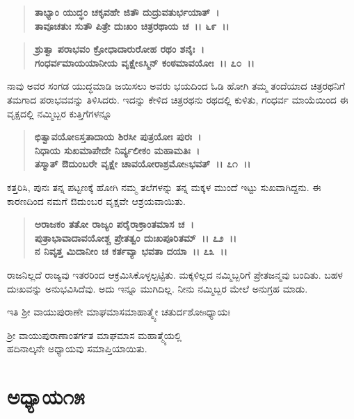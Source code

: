 \begin{verse}
\textbf{ತಾಭ್ಯಾಂ ಯುದ್ಧಂ ಚಕೃವಹೇ ಜಿತೌ ದುದ್ರುವತುರ್ಭಯಾತ್~।}\\\textbf{ತಾವೂಚತುಃ ಸುತೌ ಪಿತ್ರೇ ದುಃಖಂ ಚಿತ್ರರಥಾಯ ಚ~।। ೬೯~।।} 
\end{verse}

\begin{verse}
\textbf{ಶ್ರುತ್ವಾ ಪರಾಭವಂ ಕ್ರೋಧಾದಾರುರೋಹ ರಥಂ ಶನೈಃ~।}\\\textbf{ಗಂಧರ್ವಮಾಯಯಾನೀಯ ವೃಕ್ಷೇಽಸ್ಮಿನ್ ಕಂಠಮಾವಯೋಃ~।। ೭೦~।।}
\end{verse}

ನಾವು ಅವರ ಸಂಗಡ ಯುದ್ಧಮಾಡಿ ಜಯಿಸಲು ಅವರು ಭಯದಿಂದ ಓಡಿ ಹೋಗಿ ತಮ್ಮ ತಂದೆಯಾದ ಚಿತ್ರರಥನಿಗೆ ತಮಗಾದ ಪರಾಭವವನ್ನು ತಿಳಿಸಿದರು. ಇದನ್ನು ಕೇಳಿದ ಚಿತ್ರರಥನು ರಥದಲ್ಲಿ ಕುಳಿತು, ಗಂಧರ್ವ ಮಾಯೆಯಿಂದ ಈ ವೃಕ್ಷದಲ್ಲಿ ನಮ್ಮಿಬ್ಬರ ಕುತ್ತಿಗೆಗಳನ್ನೂ

\begin{verse}
\textbf{ಛಿತ್ವಾವಯೋಽಸ್ತತಾದಾಯ ಶಿರಸೀ ಪುತ್ರಯೋಃ ಪುರಃ~।}\\\textbf{ನಿಧಾಯ ಸುಖಮಾಪೇದೇ ನಿರ್ವ್ಯಲೀಕಂ ಮಹಾಮತಿಃ~।}\\\textbf{ತಸ್ಮಾತ್‌ ಔದುಂಬರೇ ವೃಕ್ಷೇ ಚಾವಯೋರಾಶ್ರಮೋsಭವತ್~।। ೭೧~।।}
\end{verse}

ಕತ್ತರಿಸಿ, ಪುನಃ ತನ್ನ ಪಟ್ಟಣಕ್ಕೆ ಹೋಗಿ ನಮ್ಮ ತಲೆಗಳನ್ನು ತನ್ನ ಮಕ್ಕಳ ಮುಂದೆ ಇಟ್ಟು ಸುಖವಾಗಿದ್ದನು. ಈ ಕಾರಣದಿಂದ ನಮಗೆ ಔದುಂಬರ ವೃಕ್ಷವೇ ಆಶ್ರಯವಾಯಿತು.

\begin{verse}
\textbf{ಅರಾಜಕಂ ತತೋ ರಾಜ್ಯಂ ಪರೈರಾಕ್ರಾಂತಮಾಸ ಚ~।}\\\textbf{ಪುತ್ರಾಭಾವಾದಾವಯೋಶ್ಚ ಪ್ರೇತತ್ವಂ ದುಃಖಪೂರಿತಮ್~।। ೭೨~।।}\\\textbf{ನ ನಿವೃತ್ತ ಮಿದಾನೀಂ ಚ ಕರ್ತವ್ಯಾ ಭವತಾ ದಯಾ~।। ೭೩~।।}
\end{verse}

ರಾಜನಿಲ್ಲದೆ ರಾಜ್ಯವು ಇತರರಿಂದ ಆಕ್ರಮಿಸಿಕೊಳ್ಳಲ್ಪಟ್ಟಿತು. ಮಕ್ಕಳಿಲ್ಲದ ನಮ್ಮಿಬ್ಬರಿಗೆ ಪ್ರೇತಜನ್ಮವು ಬಂದಿತು. ಬಹಳ ದುಃಖವನ್ನು ಅನುಭವಿಸಿದೆವು. ಅದು ಇನ್ನೂ ಮುಗಿದಿಲ್ಲ. ನೀನು ನಮ್ಮಿಬ್ಬರ ಮೇಲೆ ಅನುಗ್ರಹ ಮಾಡು.

\begin{center}
ಇತಿ ಶ‍್ರೀ ವಾಯುಪುರಾಣೇ ಮಾಘಮಾಸಮಾಹಾತ್ಮ್ಯೇ ಚತುರ್ದಶೋsಧ್ಯಾಯಃ 
\end{center}

\begin{center}
ಶ‍್ರೀ ವಾಯುಪುರಾಣಾಂತರ್ಗತ ಮಾಘಮಾಸ ಮಹಾತ್ಮ್ಯೆಯಲ್ಲಿ \\ ಹದಿನಾಲ್ಕನೇ ಅಧ್ಯಾಯವು ಸಮಾಪ್ತಿಯಾಯಿತು.
\end{center}

\newpage

\section*{ಅಧ್ಯಾಯ\enginline{-}೧೫}

